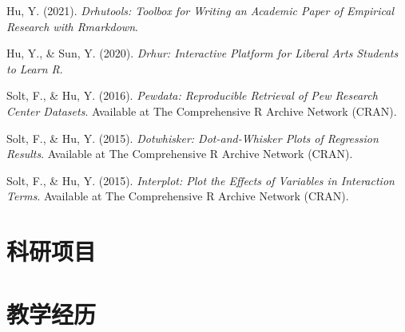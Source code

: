 \documentclass[11pt, a4paper]{awesome-cv}
\begin{document}
\leavevmode\hypertarget{ref-Hu2021}{}%
Hu, Y. (2021). \emph{Drhutools: {Toolbox} for {Writing} an {Academic
Paper} of {Empirical Research} with {Rmarkdown}}.

\leavevmode\hypertarget{ref-HuSun2020}{}%
Hu, Y., \& Sun, Y. (2020). \emph{Drhur: {Interactive Platform} for
{Liberal Arts Students} to {Learn R}}.

\leavevmode\hypertarget{ref-SoltHu2016}{}%
Solt, F., \& Hu, Y. (2016). \emph{Pewdata: {Reproducible Retrieval} of
{Pew Research Center Datasets}}. Available at The Comprehensive R
Archive Network (CRAN).

\leavevmode\hypertarget{ref-SoltHu2015}{}%
Solt, F., \& Hu, Y. (2015). \emph{Dotwhisker: {Dot}-and-{Whisker Plots}
of {Regression Results}}. Available at The Comprehensive R Archive
Network (CRAN).

\leavevmode\hypertarget{ref-SoltHu2015a}{}%
Solt, F., \& Hu, Y. (2015). \emph{Interplot: {Plot} the {Effects} of
{Variables} in {Interaction Terms}}. Available at The Comprehensive R
Archive Network (CRAN).

\endgroup

\hypertarget{ux79d1ux7814ux9879ux76ee}{%
\section{科研项目}\label{ux79d1ux7814ux9879ux76ee}}

\begin{cventries}
    \vspace{-4.0mm}
    \vspace{-4.0mm}
    \vspace{-4.0mm}
\end{cventries}

\hypertarget{ux6559ux5b66ux7ecfux5386}{%
\section{教学经历}\label{ux6559ux5b66ux7ecfux5386}}

\begin{cventries}
    \vspace{-4.0mm}
    \vspace{-4.0mm}
    \vspace{-4.0mm}
    \vspace{-4.0mm}
    \vspace{-4.0mm}
    \vspace{-4.0mm}
\end{cventries}
\end{document}
